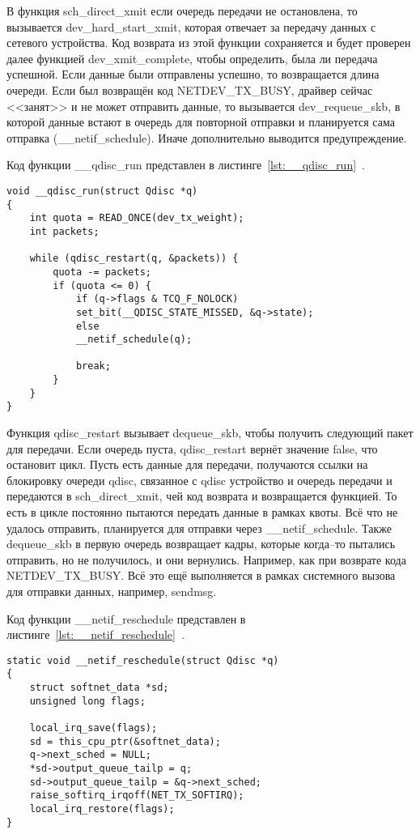 В функция sch\_direct\_xmit если очередь передачи не остановлена, то вызывается dev\_hard\_start\_xmit, которая отвечает за передачу данных с сетевого устройства. Код возврата из этой функции сохраняется и будет проверен далее функцией dev\_xmit\_complete, чтобы определить, была ли передача успешной. Если данные были отправлены успешно, то возвращается длина очереди. Если был возвращён код NETDEV\_TX\_BUSY, драйвер сейчас <<занят>> и не может отправить данные, то вызывается dev\_requeue\_skb, в которой данные встают в очередь для повторной отправки и планируется сама отправка (\_\_netif\_schedule). Иначе дополнительно выводится предупреждение.

Код функции \_\_qdisc\_run представлен в листинге~\ref{lst:__qdisc_run}~\cite{qdisc_run}.
\begin{center}
	\captionsetup{justification=raggedright,singlelinecheck=off}
	\begin{lstlisting}[label=lst:__qdisc_run,caption=Функция \_\_qdisc\_run,showstringspaces=false]
void __qdisc_run(struct Qdisc *q)
{
	int quota = READ_ONCE(dev_tx_weight);
	int packets;
	
	while (qdisc_restart(q, &packets)) {
		quota -= packets;
		if (quota <= 0) {
			if (q->flags & TCQ_F_NOLOCK)
			set_bit(__QDISC_STATE_MISSED, &q->state);
			else
			__netif_schedule(q);
			
			break;
		}
	}
}
	\end{lstlisting}
\end{center}
\FloatBarrier

Функция qdisc\_restart вызывает dequeue\_skb, чтобы получить следующий пакет для передачи. Если очередь пуста, qdisc\_restart вернёт значение false, что остановит цикл. Пусть есть данные для передачи, получаются ссылки на блокировку очереди qdisc, связанное с qdisc устройство и очередь передачи и передаются в sch\_direct\_xmit, чей код возврата и возвращается функцией. То есть в цикле постоянно пытаются передать данные в рамках квоты. Всё что не удалось отправить, планируется для отправки через \_\_netif\_schedule. Также dequeue\_skb в первую очередь возвращает кадры, которые когда--то пытались отправить, но не получилось, и они вернулись. Например, как при возврате кода NETDEV\_TX\_BUSY. Всё это ещё выполняется в рамках системного вызова для отправки данных, например, sendmsg.

Код функции \_\_netif\_reschedule представлен в листинге~\ref{lst:__netif_reschedule}~\cite{netif_reschedule}.
\begin{center}
	\captionsetup{justification=raggedright,singlelinecheck=off}
	\begin{lstlisting}[label=lst:__netif_reschedule,caption=Функция \_\_netif\_reschedule,showstringspaces=false]
static void __netif_reschedule(struct Qdisc *q)
{
	struct softnet_data *sd;
	unsigned long flags;
	
	local_irq_save(flags);
	sd = this_cpu_ptr(&softnet_data);
	q->next_sched = NULL;
	*sd->output_queue_tailp = q;
	sd->output_queue_tailp = &q->next_sched;
	raise_softirq_irqoff(NET_TX_SOFTIRQ);
	local_irq_restore(flags);
}
	\end{lstlisting}
\end{center}
\FloatBarrier

